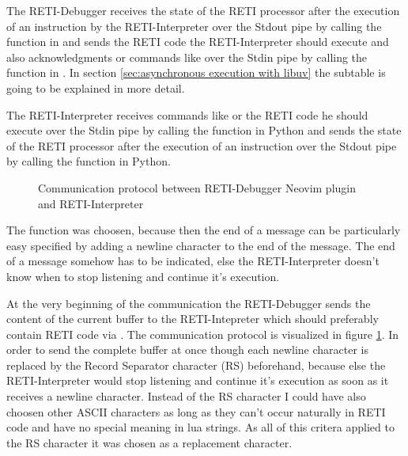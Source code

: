 \documentclass{report}
\begin{document}
The RETI-Debugger receives the state of the RETI processor after the execution of an instruction by the RETI-Interpreter over the Stdout pipe by calling the  function in  and sends the RETI code the RETI-Interpreter should execute and also acknowledgments or commands like  over the Stdin pipe by calling the  function in . In section \ref{sec:asynchronous execution with libuv}  the subtable  is going to be explained in more detail.

The RETI-Interpreter receives commands like  or the RETI code he should execute over the Stdin pipe by calling the  function in Python and sends the state of the RETI processor after the execution of an instruction over the Stdout pipe by calling the  function in Python.

\begin{figure}
	\centering
	\caption{Communication protocol between RETI-Debugger Neovim plugin and RETI-Interpreter}
	\label{fig:communication reti debugger and reti interpreter}
\end{figure}


The  function was choosen, because then the end of a message can be particularly easy specified by adding a newline character  to the end of the message. The end of a message somehow has to be indicated, else the RETI-Interpreter doesn't know when to stop listening and continue it's execution.

At the very beginning of the communication the RETI-Debugger sends the content of the current buffer to the RETI-Intepreter which should preferably contain RETI code via  . The \alert{communication protocol} is visualized in figure \ref{fig:communication reti debugger and reti interpreter}. In order to send the complete buffer at once though each newline character  is replaced by the Record Separator character (\alert{RS})  beforehand, because else the RETI-Interpreter would stop listening and continue it's execution as soon as it receives a newline character. Instead of the RS character I could have also choosen other ASCII characters as long as they can't occur naturally in RETI code and have no special meaning in lua strings. As all of this critera applied to the RS character it was chosen as a replacement character.
\end{document}
